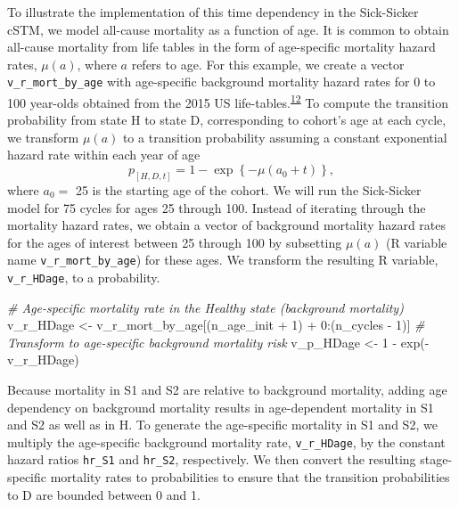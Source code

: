\documentclass[
]{article}
\newenvironment{Shaded}{\begin{snugshade}}{\end{snugshade}}
\newcommand{\CommentTok}[1]{\textcolor[rgb]{0.56,0.35,0.01}{\textit{#1}}}
\newcommand{\DecValTok}[1]{\textcolor[rgb]{0.00,0.00,0.81}{#1}}
\newcommand{\FunctionTok}[1]{\textcolor[rgb]{0.00,0.00,0.00}{#1}}
\newcommand{\NormalTok}[1]{#1}
\newcommand{\OtherTok}[1]{\textcolor[rgb]{0.56,0.35,0.01}{#1}}
\newcommand{\SpecialCharTok}[1]{\textcolor[rgb]{0.00,0.00,0.00}{#1}}
\begin{document}
To illustrate the implementation of this time dependency in the Sick-Sicker cSTM, we model all-cause mortality as a function of age. It is common to obtain all-cause mortality from life tables in the form of age-specific mortality hazard rates, \(\mu(a)\), where \(a\) refers to age. For this example, we create a vector \texttt{v\_r\_mort\_by\_age} with age-specific background mortality hazard rates for 0 to 100 year-olds obtained from the 2015 US life-tables.\textsuperscript{\protect\hyperlink{ref-Arias2017}{12}} To compute the transition probability from state H to state D, corresponding to cohort's age at each cycle, we transform \(\mu(a)\) to a transition probability assuming a constant exponential hazard rate within each year of age
\[
  p_{[H,D,t]} = 1-\exp\left\{{-\mu(a_0 + t)}\right\},
\]
where \(a_0 =\) 25 is the starting age of the cohort. We will run the Sick-Sicker model for 75 cycles for ages 25 through 100. Instead of iterating through the mortality hazard rates, we obtain a vector of background mortality hazard rates for the ages of interest between 25 through 100 by subsetting \(\mu(a)\) (R variable name \texttt{v\_r\_mort\_by\_age}) for these ages. We transform the resulting R variable, \texttt{v\_r\_HDage}, to a probability.

\begin{Shaded}
\begin{Highlighting}[]
\CommentTok{\# Age{-}specific mortality rate in the Healthy state (background mortality)}
\NormalTok{v\_r\_HDage }\OtherTok{\textless{}{-}}\NormalTok{ v\_r\_mort\_by\_age[(n\_age\_init }\SpecialCharTok{+} \DecValTok{1}\NormalTok{) }\SpecialCharTok{+} \DecValTok{0}\SpecialCharTok{:}\NormalTok{(n\_cycles }\SpecialCharTok{{-}} \DecValTok{1}\NormalTok{)]}
\CommentTok{\# Transform to age{-}specific background mortality risk}
\NormalTok{v\_p\_HDage  }\OtherTok{\textless{}{-}} \DecValTok{1} \SpecialCharTok{{-}} \FunctionTok{exp}\NormalTok{(}\SpecialCharTok{{-}}\NormalTok{v\_r\_HDage) }
\end{Highlighting}
\end{Shaded}

Because mortality in S1 and S2 are relative to background mortality, adding age dependency on background mortality results in age-dependent mortality in S1 and S2 as well as in H. To generate the age-specific mortality in S1 and S2, we multiply the age-specific background mortality rate, \texttt{v\_r\_HDage}, by the constant hazard ratios \texttt{hr\_S1} and \texttt{hr\_S2}, respectively. We then convert the resulting stage-specific mortality rates to probabilities to ensure that the transition probabilities to D are bounded between 0 and 1.
\end{document}

